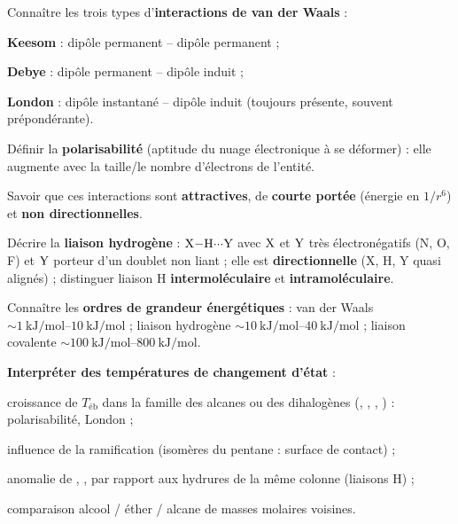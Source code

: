 \documentclass[11pt,a4paper]{article}
\begin{document}
\begin{savoir}
  \item Connaître les trois types d'\textbf{interactions de van der Waals} :
    \begin{savoir}
      \item \textbf{Keesom} : dipôle permanent -- dipôle permanent ;
      \item \textbf{Debye} : dipôle permanent -- dipôle induit ;
      \item \textbf{London} : dipôle instantané -- dipôle induit (toujours présente, souvent
            prépondérante).
    \end{savoir}
  \item Définir la \textbf{polarisabilité} (aptitude du nuage électronique à se déformer) :
        elle augmente avec la taille/le nombre d'électrons de l'entité.
  \item Savoir que ces interactions sont \textbf{attractives}, de \textbf{courte portée}
        (énergie en $1/r^6$) et \textbf{non directionnelles}.
  \item Décrire la \textbf{liaison hydrogène} : $\ce{X-H\bond{...}Y}$ avec $\ce{X}$ et $\ce{Y}$ très
        électronégatifs (N, O, F) et $\ce{Y}$ porteur d'un doublet non liant ;
        elle est \textbf{directionnelle} (X, H, Y quasi alignés) ;
        distinguer liaison H \textbf{intermoléculaire} et \textbf{intramoléculaire}.
  \item Connaître les \textbf{ordres de grandeur énergétiques} :
        van der Waals $\sim \SIrange{1}{10}{\kilo\joule\per\mol}$ ;
        liaison hydrogène $\sim \SIrange{10}{40}{\kilo\joule\per\mol}$ ;
        liaison covalente $\sim \SIrange{100}{800}{\kilo\joule\per\mol}$.
  \item \textbf{Interpréter des températures de changement d'état} :
    \begin{savoir}
      \item croissance de $T_{\text{éb}}$ dans la famille des alcanes ou des dihalogènes
            (, , , ) : polarisabilité, London ;
      \item influence de la ramification (isomères du pentane : surface de contact) ;
      \item anomalie de , ,  par rapport aux hydrures de la même colonne
            (liaisons H) ;
      \item comparaison alcool / éther / alcane de masses molaires voisines.
    \end{savoir}
\end{savoir}
\end{document}
